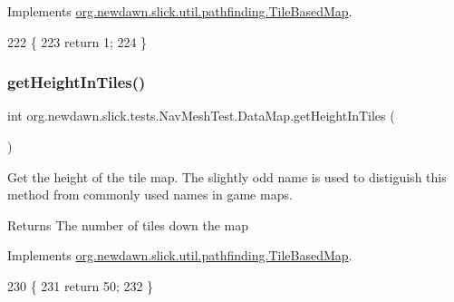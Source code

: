 Implements \mbox{\hyperlink{interfaceorg_1_1newdawn_1_1slick_1_1util_1_1pathfinding_1_1_tile_based_map_ad2e68a8e3405c15b90b5247ffb70897f}{org.\+newdawn.\+slick.\+util.\+pathfinding.\+Tile\+Based\+Map}}.


\begin{DoxyCode}
222                                                                          \{
223             \textcolor{keywordflow}{return} 1;
224         \}
\end{DoxyCode}
\mbox{\label{classorg_1_1newdawn_1_1slick_1_1tests_1_1_nav_mesh_test_1_1_data_map_a17b7ae15c28e0d59d4ef2f789f13dad9}} 
\subsubsection{\texorpdfstring{get\+Height\+In\+Tiles()}{getHeightInTiles()}}
{\footnotesize\ttfamily int org.\+newdawn.\+slick.\+tests.\+Nav\+Mesh\+Test.\+Data\+Map.\+get\+Height\+In\+Tiles (\begin{DoxyParamCaption}{ }\end{DoxyParamCaption})\hspace{0.3cm}{\ttfamily [inline]}}

Get the height of the tile map. The slightly odd name is used to distiguish this method from commonly used names in game maps.

\begin{DoxyReturn}{Returns}
The number of tiles down the map 
\end{DoxyReturn}


Implements \mbox{\hyperlink{interfaceorg_1_1newdawn_1_1slick_1_1util_1_1pathfinding_1_1_tile_based_map_a9669f3dafa1ce48a20e3d7d8c1de239a}{org.\+newdawn.\+slick.\+util.\+pathfinding.\+Tile\+Based\+Map}}.


\begin{DoxyCode}
230                                       \{
231             \textcolor{keywordflow}{return} 50;
232         \}
\end{DoxyCode}
\mbox{\label{classorg_1_1newdawn_1_1slick_1_1tests_1_1_nav_mesh_test_1_1_data_map_a9c463e2f4c3c3c208961d40e40529cb3}} 
